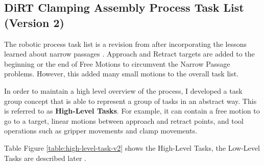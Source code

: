 \subsection{DiRT Clamping Assembly Process Task List (Version 2)}
\label{subsection:exploration-3-dirt-clamping-assembly-process-task-list-v2}

The robotic process task list is a revision from  after incorporating the lessons learned about narrow passages . Approach and Retract targets are added to the beginning or the end of Free Motions to circumvent the Narrow Passage problems. However, this added many small motions to the overall task list.

In order to maintain a high level overview of the process, I developed a task group concept that is able to represent a group of tasks in an abstract way. This is referred to as \textbf{High-Level Tasks}. For example, it can contain a free motion to go to a target, linear motions between approach and retract points, and tool operations such as gripper movements and clamp movements. 

Table Figure \ref{table:high-level-task-v2} shows the High-Level Tasks, the Low-Level Tasks are described later . 

